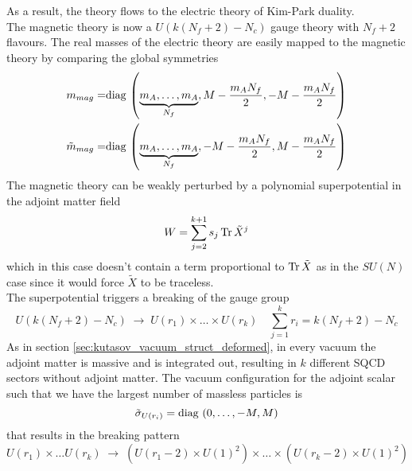 As a result, the theory flows to the electric theory of Kim-Park duality.\\
The magnetic theory is now a $U(k(N_f + 2) - N_c)$ gauge theory with $N_f +2$ flavours. 
The real masses of the electric theory are easily mapped to the magnetic theory by comparing the global symmetries
\begin{align}
 m_{mag} =&    \hbox{diag\,} \left(  \underbrace{m_A , \dotsc, m_A}_{N_f} ,  M- \frac{m_A N_f}{2} , -M -\frac{m_A N_f}{2}\right)  \\
  \tilde{m}_{mag} =& \hbox{diag\,} \left(
  \underbrace{
  m_A,\dotsc,m_A
}_{N_f}
  , -M - \frac{m_A N_f}{2}, M - \frac{m_A N_f}{2}\right)
\end{align}
%
%
The magnetic theory can be weakly perturbed by a polynomial superpotential in the adjoint matter field
\begin{equation}
W = \sum_{j=2}^{k+1} s_j \, \mathrm{Tr } \,{\tilde{X}^{j}}
\end{equation}
which in this case doesn't contain a term proportional to $\mathrm{Tr } \,{\tilde{X}}$ as in the $SU(N) $ case since it would force $\tilde{X}$ to be traceless.\\
The superpotential triggers a breaking of the gauge group 
\begin{equation}
 U(k (N_f + 2) - N_c ) \; \longrightarrow \; U(r_1) \times \dots \times U(r_k) \quad \sum_{j=1}^k r_i = k (N_f + 2) - N_c
  \end{equation}
As in section \ref{sec:kutasov_vacuum_struct_deformed}, in every vacuum the adjoint matter is massive and is integrated out, resulting in $k$ different SQCD sectors without adjoint matter.
The vacuum configuration for the adjoint scalar such that we have the largest number of massless particles is
\begin{equation}
   \tilde{\sigma}_{U(r_i)} = \hbox{diag\,} \left(  0, \dots, - M , M \right)
  \end{equation}
that results in the breaking pattern
\begin{equation}
U(r_1) \times \dots U(r_k) \; \longrightarrow \; \left( U(r_1-2) \times U(1)^2 \right) \times  \dots \times \left( U(r_k-2) \times U(1)^2 \right) 
\end{equation}
